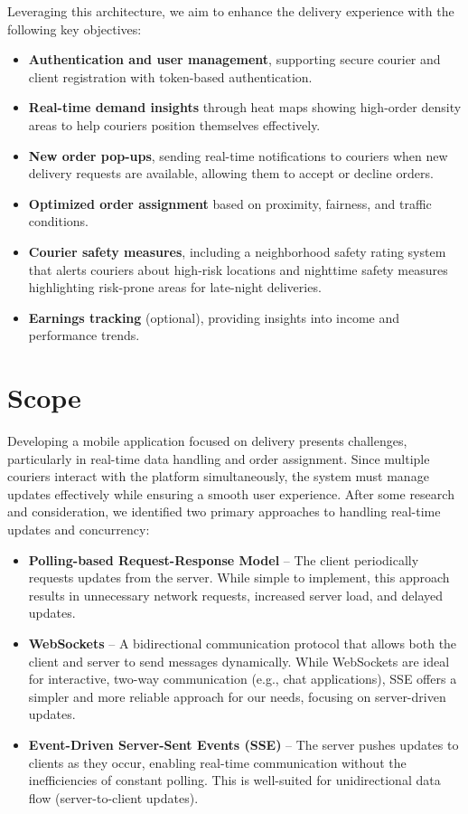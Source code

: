 \documentclass[a4paper,twoside,11pt]{article}
\begin{document}
{Leveraging this architecture, we aim to enhance the delivery experience with the following key objectives:  
\begin{itemize}
    \item \textbf{Authentication and user management}, supporting secure courier and client registration with token-based authentication. 
    \item \textbf{Real-time demand insights} through heat maps showing high-order density areas to help couriers position themselves effectively.
    \item \textbf{New order pop-ups}, sending real-time notifications to couriers when new delivery requests are available, allowing them to accept or decline orders.
    \item \textbf{Optimized order assignment} based on proximity, fairness, and traffic conditions. 
    \item \textbf{Courier safety measures}, including a neighborhood safety rating system that alerts couriers about high-risk locations and nighttime safety measures highlighting risk-prone areas for late-night deliveries.   
    \item \textbf{Earnings tracking} (optional), providing insights into income and performance trends.   
\end{itemize}

\section*{Scope}

Developing a mobile application focused on delivery presents challenges, particularly in real-time data handling and order assignment. Since multiple couriers interact with the platform simultaneously, the system must manage updates effectively while ensuring a smooth user experience. After some research and consideration, we identified two primary approaches to handling real-time updates and concurrency:

\begin{itemize}
    \item \textbf{Polling-based Request-Response Model} – The client periodically requests updates from the server. While simple to implement, this approach results in unnecessary network requests, increased server load, and delayed updates.
    \item \textbf{WebSockets} – A bidirectional communication protocol that allows both the client and server to send messages dynamically. While WebSockets are ideal for interactive, two-way communication (e.g., chat applications), SSE offers a simpler and more reliable approach for our needs, focusing on server-driven updates.
    \item \textbf{Event-Driven Server-Sent Events (SSE)} – The server pushes updates to clients as they occur, enabling real-time communication without the inefficiencies of constant polling. This is well-suited for unidirectional data flow (server-to-client updates).
\end{itemize}

}
\end{document}
